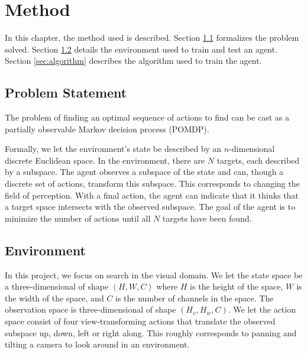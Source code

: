 \chapter{Method}
\label{cha:method}

In this chapter, the method used is described.
Section \ref{sec:problem} formalizes the problem solved.
Section \ref{sec:environment} details the environment used to train and test an agent.
Section \ref{sec:algorithm} describes the algorithm used to train the agent.

\section{Problem Statement}
\label{sec:problem}


The problem of finding an optimal sequence of actions to find can be cast as a partially observable Markov decision process (POMDP). 

Formally, we let the environment's state be described by an \(n\)-dimensional discrete Euclidean space.
In the environment, there are \(N\) targets, each described by a subspace.
The agent observes a subspace of the state and can, though a discrete set of actions, transform this subspace.
This corresponds to changing the field of perception.
With a final action, the agent can indicate that it thinks that a target space intersects with the observed subspace.
The goal of the agent is to minimize the number of actions until all \(N\) targets have been found.


\section{Environment}
\label{sec:environment}

In this project, we focus on search in the visual domain.
We let the state space be a three-dimensional of shape \((H, W, C)\) where \(H\) is the height of the space, \(W\) is the width of the space, and \(C\) is the number of channels in the space.
The observation space is three-dimensional of shape \((H_v, H_w, C)\).
We let the action space consist of four view-transforming actions that translate the observed subspace up, down, left or right along.
This roughly corresponds to panning and tilting a camera to look around in an environment.

